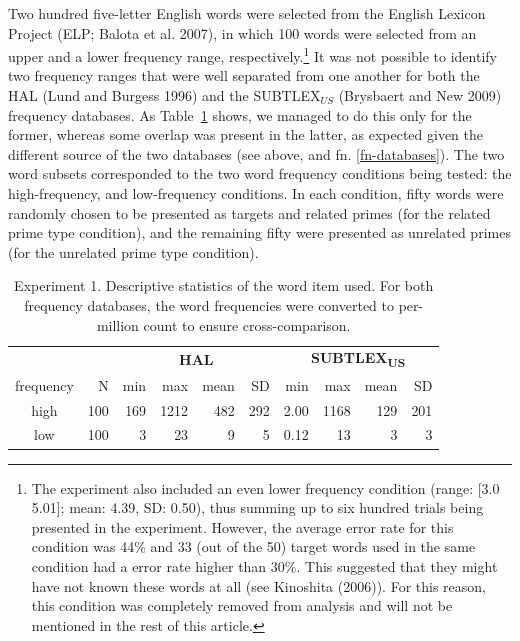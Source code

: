 \documentclass[
]{interact}
\begin{document}
Two hundred five-letter English words were selected from the English
Lexicon Project (ELP; Balota et al. 2007), in which 100 words were
selected from an upper and a lower frequency range,
respectively.\footnote{The experiment also included an even lower
  frequency condition (range: {[}3.0 5.01{]}; mean: 4.39, SD: 0.50),
  thus summing up to six hundred trials being presented in the
  experiment. However, the average error rate for this condition was
  44\% and 33 (out of the 50) target words used in the same condition
  had a error rate higher than 30\%. This suggested that they might have
  not known these words at all (see Kinoshita (2006)). For this reason,
  this condition was completely removed from analysis and will not be
  mentioned in the rest of this article.} It was not possible to
identify two frequency ranges that were well separated from one another
for both the HAL (Lund and Burgess 1996) and the SUBTLEX\(_{US}\)
(Brysbaert and New 2009) frequency databases. As
Table~\ref{tbl-words_exp1} shows, we managed to do this only for the
former, whereas some overlap was present in the latter, as expected
given the different source of the two databases (see above, and fn.
\ref{fn-databases}). The two word subsets corresponded to the two word
frequency conditions being tested: the high-frequency, and low-frequency
conditions. In each condition, fifty words were randomly chosen to be
presented as targets and related primes (for the related prime type
condition), and the remaining fifty were presented as unrelated primes
(for the unrelated prime type condition).

\begin{longtable}{crrrrrrrrr}

\caption{\label{tbl-words_exp1}Experiment 1. Descriptive statistics of
the word item used. For both frequency databases, the word frequencies
were converted to per-million count to ensure cross-comparison.}

\tabularnewline

\toprule
 &  & \multicolumn{4}{c}{\textbf{HAL}} & \multicolumn{4}{c}{\textbf{SUBTLEX\textsubscript{US}}} \\ 
\cmidrule(lr){3-6} \cmidrule(lr){7-10}
frequency & N & min & max & mean & SD & min & max & mean & SD \\ 
\midrule\addlinespace[2.5pt]
high & 100 & 169 & 1212 & 482 & 292 & 2.00 & 1168 & 129 & 201 \\ 
low & 100 & 3 & 23 & 9 & 5 & 0.12 & 13 & 3 & 3 \\ 
\bottomrule

\end{longtable}
\end{document}
